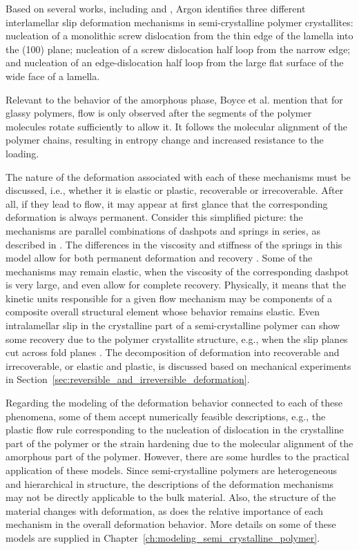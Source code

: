 Based on several works, including \cite{petersonThermalInitiationScrew1966} and \cite{linRateMechanismPlasticity1994}, Argon \citep{argonPhysicsDeformationFracture2013a} identifies three different interlamellar slip deformation mechanisms in semi-crystalline polymer crystallites: nucleation of a monolithic screw dislocation from the thin edge of the lamella into the (100) plane; nucleation of a screw dislocation half loop from the narrow edge; and nucleation of an edge-dislocation half loop from the large flat surface of the wide face of a lamella.

Relevant to the behavior of the amorphous phase, Boyce et al. \citep{boyceLargeInelasticDeformation1988} mention that for glassy polymers, flow is only observed after the segments of the polymer molecules rotate sufficiently to allow it.
It follows the molecular alignment of the polymer chains, resulting in entropy change and increased resistance to the loading.

The nature of the deformation associated with each of these mechanisms must be discussed, i.e., whether it is elastic or plastic, recoverable or irrecoverable.
After all, if they lead to flow, it may appear at first glance that the corresponding deformation is always permanent.
Consider this simplified picture: the mechanisms are parallel combinations of dashpots and springs in series, as described in \cite{kellerIdentificationStructuralProcesses1971}.
The differences in the viscosity and stiffness of the springs in this model allow for both permanent deformation and recovery \citep{fotheringhamRoleRecoveryForces1978}.
Some of the mechanisms may remain elastic, when the viscosity of the corresponding dashpot is very large, and even allow for complete recovery.
Physically, it means that the kinetic units responsible for a given flow mechanism may be components of a composite overall structural element whose behavior remains elastic.
Even intralamellar slip in the crystalline part of a semi-crystalline polymer can show some recovery due to the polymer crystallite structure, e.g., when the slip planes cut across fold planes \citep{kellerIdentificationStructuralProcesses1971}.
The decomposition of deformation into recoverable and irrecoverable, or elastic and plastic, is discussed based on mechanical experiments in Section~\ref{sec:reversible_and_irreversible_deformation}.

Regarding the modeling of the deformation behavior connected to each of these phenomena, some of them accept numerically feasible descriptions, e.g., the plastic flow rule corresponding to the nucleation of dislocation in the crystalline part of the polymer or the strain hardening due to the molecular alignment of the amorphous part of the polymer.
However, there are some hurdles to the practical application of these models.
Since semi-crystalline polymers are heterogeneous and hierarchical in structure, the descriptions of the deformation mechanisms may not be directly applicable to the bulk material.
Also, the structure of the material changes with deformation, as does the relative importance of each mechanism in the overall deformation behavior.
More details on some of these models are supplied in Chapter~\ref{ch:modeling_semi_crystalline_polymer}.

